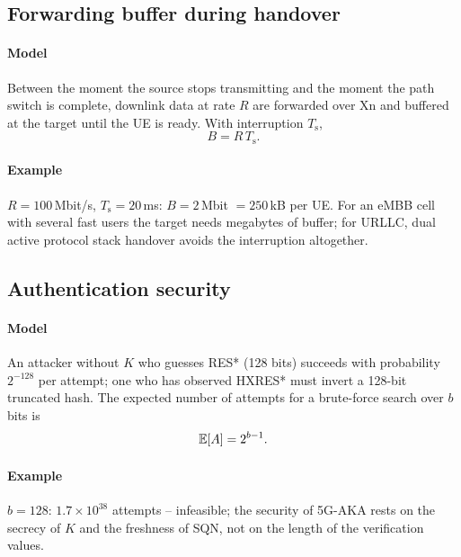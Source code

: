 \documentclass[11pt,a4paper]{article}
\begin{document}
\begin{acnfigure}
  \caption{AMF message load per procedure type for the illustrative model of \cref{sec:load}.}
  \label{fig:load}
\end{acnfigure}

\subsection{Forwarding buffer during handover}\label{sec:fwd}
\paragraph{Model} Between the moment the source stops transmitting and the moment the path switch is complete, downlink data at rate $R$ are
forwarded over Xn and buffered at the target until the UE is ready. With interruption $T_{\mathrm{s}}$,
\begin{equation}\label{eq:fwd}
  B = R\,T_{\mathrm{s}} .
\end{equation}
\paragraph{Example} $R = 100$\,Mbit/s, $T_{\mathrm{s}} = 20$\,ms: $B = 2$\,Mbit $= 250$\,kB per UE. For an eMBB cell with several fast users the target
needs megabytes of buffer; for URLLC, dual active protocol stack handover avoids the interruption altogether.

\subsection{Authentication security}\label{sec:sec}
\paragraph{Model} An attacker without $K$ who guesses RES* (128 bits) succeeds with probability $2^{-128}$ per attempt; one who has observed HXRES*
must invert a 128-bit truncated hash. The expected number of attempts for a brute-force search over $b$ bits is
\begin{equation}\label{eq:brute}
  \mathbb{E}[A] = 2^{b-1}.
\end{equation}
\paragraph{Example} $b = 128$: $1.7\times10^{38}$ attempts -- infeasible; the security of 5G-AKA rests on the secrecy of $K$ and the freshness of SQN,
not on the length of the verification values.
\end{document}
